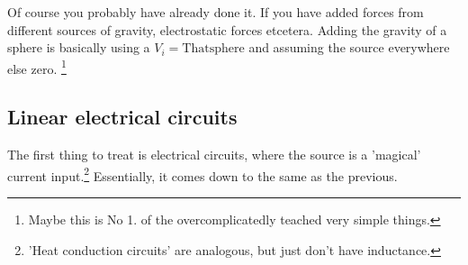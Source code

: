 \documentclass{article}
\begin{document}
Of course you probably have already done it. If you have added forces from 
different sources of gravity, electrostatic forces etcetera. Adding the 
gravity of a sphere is basically using a $V_i=\mathrm{That sphere}$ and 
assuming the source everywhere else zero.
\footnote{Maybe this is No 1. of the overcomplicatedly teached very simple 
things.}

\subsection*{Linear electrical circuits}
The first thing to treat is electrical circuits, where the source is a 
'magical' current input.\footnote{'Heat conduction circuits' are analogous, 
but just don't have inductance.} Essentially, it comes down to the same as the
previous.
\end{document}
